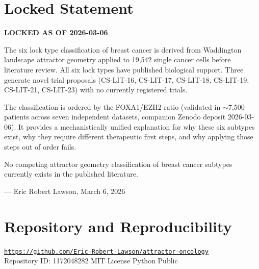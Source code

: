 \documentclass[12pt, a4paper]{article}
\begin{document}
\section{Locked Statement}

\begin{center}
\colorbox{novelbox}{
\begin{minipage}{0.88\textwidth}
\vspace{0.6em}
\textbf{LOCKED AS OF 2026-03-06}

\medskip
The six lock type classification of breast cancer is
derived from Waddington landscape attractor geometry
applied to 19,542 single cancer cells before literature
review. All six lock types have published biological
support. Three generate novel trial proposals
(CS-LIT-16, CS-LIT-17, CS-LIT-18, CS-LIT-19,
CS-LIT-21, CS-LIT-23) with no currently registered
trials.

\medskip
The classification is ordered by the FOXA1/EZH2 ratio
(validated in $\sim$7,500 patients across seven
independent datasets, companion Zenodo deposit
2026-03-06). It provides a mechanistically unified
explanation for why these six subtypes exist, why they
require different therapeutic first steps, and why
applying those steps out of order fails.

\medskip
No competing attractor geometry classification of
breast cancer subtypes currently exists in the
published literature.

\medskip
\hfill --- Eric Robert Lawson, March 6, 2026
\vspace{0.4em}
\end{minipage}
}
\end{center}

\section*{Repository and Reproducibility}

\begin{center}
\href{https://github.com/Eric-Robert-Lawson/attractor-oncology}
{\texttt{https://github.com/Eric-Robert-Lawson/attractor-oncology}}\\[0.3em]
\small Repository ID: 1172048282 \textbar{}
MIT License \textbar{}
Python \textbar{}
Public
\end{center}
\end{document}
